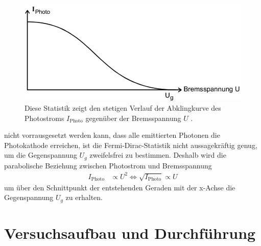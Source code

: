     \begin{figure}[H]
        \centering
        \includegraphics[width=\textwidth]{images/Dirac.jpg}
        \caption{Diese Statistik zeigt den stetigen Verlauf der Abklingkurve des Photostroms $I_{\text{Photo}}$ gegenüber der Bremsspannung $U$ \cite{V500}.}
        \label{fig:4}
    \end{figure}
    \justifying nicht vorrausgesetzt werden kann, dass alle emittierten Photonen die Photokathode erreichen, ist die Fermi-Dirac-Statistik nicht aussagekräftig genug, 
    um die Gegenspannung $U_g$ zweifelsfrei zu bestimmen. Deshalb wird die parabolische Beziehung zwischen Photostrom und Bremsspannung \cite{V500}
    \begin{align}
        I_{\text{Photo}} &\propto U^2 \Leftrightarrow \sqrt{I_{\text{Photo}}} \propto U \label{eq:4}
    \end{align}
    \justifying um über den Schnittpunkt der entstehenden Geraden mit der x-Achse die Gegenspannung $U_g$ zu erhalten.

\newpage
\section{Versuchsaufbau und Durchführung}

